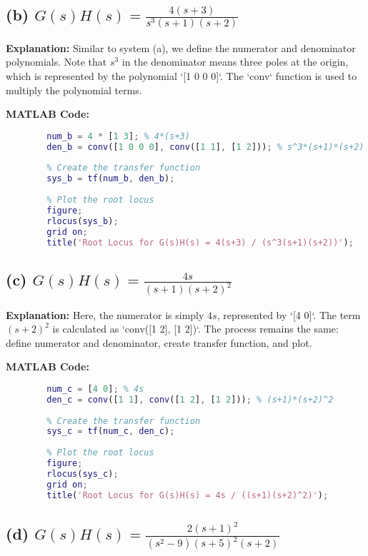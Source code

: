 \documentclass[a4paper,12pt]{article}
\begin{document}
	\subsection*{(b) $G(s)H(s) = \frac{4(s+3)}{s^3(s+1)(s+2)}$}
	
	\textbf{Explanation:}
	Similar to system (a), we define the numerator and denominator polynomials. Note that $s^3$ in the denominator means three poles at the origin, which is represented by the polynomial `[1 0 0 0]`. The `conv` function is used to multiply the polynomial terms.
	
	\textbf{MATLAB Code:}
	\begin{lstlisting}[language=Matlab, caption=MATLAB Code for System (b)]
		% Define the numerator and denominator polynomials
		num_b = 4 * [1 3]; % 4*(s+3)
		den_b = conv([1 0 0 0], conv([1 1], [1 2])); % s^3*(s+1)*(s+2)
		
		% Create the transfer function
		sys_b = tf(num_b, den_b);
		
		% Plot the root locus
		figure;
		rlocus(sys_b);
		grid on;
		title('Root Locus for G(s)H(s) = 4(s+3) / (s^3(s+1)(s+2))');
	\end{lstlisting}
	
	\subsection*{(c) $G(s)H(s) = \frac{4s}{(s+1)(s+2)^2}$}
	
	\textbf{Explanation:}
	Here, the numerator is simply $4s$, represented by `[4 0]`. The term $(s+2)^2$ is calculated as `conv([1 2], [1 2])`. The process remains the same: define numerator and denominator, create transfer function, and plot.
	
	\textbf{MATLAB Code:}
	\begin{lstlisting}[language=Matlab, caption=MATLAB Code for System (c)]
		% Define the numerator and denominator polynomials
		num_c = [4 0]; % 4s
		den_c = conv([1 1], conv([1 2], [1 2])); % (s+1)*(s+2)^2
		
		% Create the transfer function
		sys_c = tf(num_c, den_c);
		
		% Plot the root locus
		figure;
		rlocus(sys_c);
		grid on;
		title('Root Locus for G(s)H(s) = 4s / ((s+1)(s+2)^2)');
	\end{lstlisting}
	
	\subsection*{(d) $G(s)H(s) = \frac{2(s+1)^2}{(s^2-9)(s+5)^2(s+2)}$}
	
\end{document}
